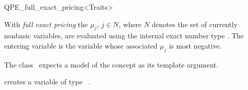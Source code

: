 
\begin{ccRefClass}{QPE_full_exact_pricing<Traits>}

\ccDefinition
With \emph{full exact pricing} the $\mu_{j}$, $j \in N$, where $N$ denotes the
set of currently nonbasic variables, are evaluated using the
internal exact number type . The entering variable is the variable
whose associated $\mu_{j}$ is most negative.


\ccInheritsFrom
{}

\ccRequirements
\ccIndexRequirements

The class \ccRefName\ expects a model of the concept
 as its template argument. 

\ccTypes \ccIndexClassTypes


\ccCreation
\ccIndexClassCreation
{}

\ccConstructor{ ( );}
{creates a variable of type \ccRefName\ .}


\ccUnchecked

\ccAccessFunctions
\begin{ccIndexMemberFunctions}


\ccPredicates
{}



\end{ccIndexMemberFunctions}
\end{ccRefClass}
